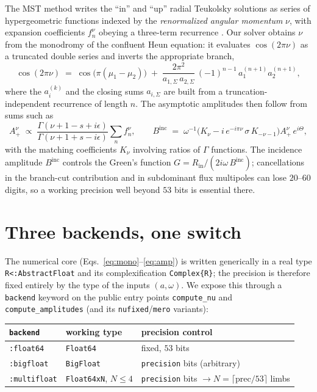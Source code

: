 \documentclass[11pt]{article}
\newcommand{\Binc}{B^{\mathrm{inc}}}
\begin{document}
The MST method writes the ``in'' and ``up'' radial Teukolsky solutions as series
of hypergeometric functions indexed by the \emph{renormalized angular momentum}
$\nu$, with expansion coefficients $f^\nu_n$ obeying a three-term recurrence
\cite{ST2003}. Our solver obtains $\nu$ from the monodromy of the confluent Heun
equation: it evaluates $\cos(2\pi\nu)$ as a truncated double series and inverts
the appropriate branch,
\begin{equation}
\cos(2\pi\nu) \;=\; \cos\!\big(\pi(\mu_1-\mu_2)\big)
  \;+\; \frac{2\pi^2}{a_{1,\Sigma}\,a_{2,\Sigma}}\,(-1)^{n-1}\,a_1^{(n+1)}a_2^{(n+1)},
\label{eq:mono}
\end{equation}
where the $a_i^{(k)}$ and the closing sums $a_{i,\Sigma}$ are built from a
truncation-independent recurrence of length $n$. The asymptotic amplitudes then
follow from sums such as
\begin{equation}
A^\nu_+ \;\propto\; \frac{\Gamma(\nu+1-s+i\epsilon)}{\Gamma(\nu+1+s-i\epsilon)}
  \sum_{n} f^\nu_n,
\qquad
\Binc \;=\; \omega^{-1}\big(K_\nu - i\,e^{-i\pi\nu}\,\sigma\,K_{-\nu-1}\big)A^\nu_+\,e^{i\Theta},
\label{eq:amp}
\end{equation}
with the matching coefficients $K_\nu$ involving ratios of $\Gamma$ functions.
The incidence amplitude $\Binc$ controls the Green's function
$G = R_{\mathrm{in}}/(2i\omega\,\Binc)$; cancellations in the branch-cut
contribution and in subdominant flux multipoles can lose $20$--$60$ digits, so a
working precision well beyond $53$ bits is essential there.

\section{Three backends, one switch}

The numerical core (Eqs.~\eqref{eq:mono}--\eqref{eq:amp}) is written generically
in a real type \texttt{R<:AbstractFloat} and its complexification
\texttt{Complex\{R\}}; the precision is therefore fixed entirely by the type of
the inputs $(a,\omega)$. We expose this through a \texttt{backend} keyword on the
public entry points \texttt{compute\_nu} and \texttt{compute\_amplitudes} (and
its \texttt{nufixed}/\texttt{mero} variants):

\begin{center}
\begin{tabular}{@{}lll@{}}
\toprule
\texttt{backend} & working type & precision control \\
\midrule
\texttt{:float64}    & \texttt{Float64}             & fixed, $53$ bits \\
\texttt{:bigfloat}   & \texttt{BigFloat}            & \texttt{precision} bits (arbitrary) \\
\texttt{:multifloat} & \texttt{Float64xN}, $N\le 4$ & \texttt{precision} bits $\to N=\lceil \text{prec}/53\rceil$ limbs \\
\bottomrule
\end{tabular}
\end{center}
\end{document}
